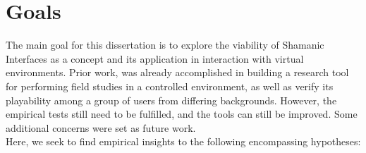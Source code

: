 \section{Goals} \label{sec:intro_goals}
    The main goal for this dissertation is to explore the viability of Shamanic Interfaces as a concept and its application in interaction with virtual environments. Prior work\cite{pinto2015}, was already accomplished in building a research tool for performing field studies in a controlled environment, as well as verify its playability among a group of users from differing backgrounds. However, the empirical tests still need to be fulfilled, and the tools can still be improved. Some additional concerns were set as future work.\\
    
    Here, we seek to find empirical insights to the following encompassing hypotheses:
    
